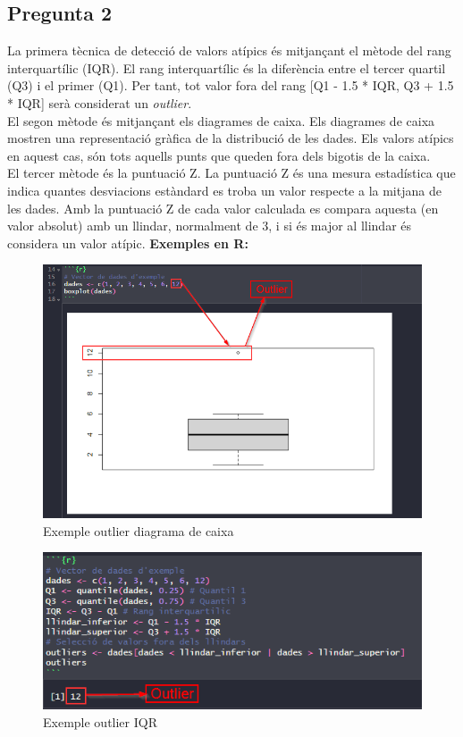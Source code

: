 \documentclass[a4paper,12pt]{report}
\begin{document}
\subsection*{Pregunta 2}
La primera tècnica de detecció de valors atípics és mitjançant el mètode del rang interquartílic (IQR). El rang interquartílic és la diferència entre el tercer quartil (Q3) i el primer (Q1). Per tant, tot valor fora del rang [Q1 - 1.5 * IQR, Q3 + 1.5 * IQR] serà considerat un \textit{outlier}.\\
El segon mètode és mitjançant els diagrames de caixa. Els diagrames de caixa mostren una representació gràfica de la distribució de les dades. Els valors atípics en aquest cas, són tots aquells punts que queden fora dels bigotis de la caixa.\\
El tercer mètode és la puntuació Z. La puntuació Z és una mesura estadística que indica quantes desviacions estàndard es troba un valor respecte a la mitjana de les dades. Amb la puntuació Z de cada valor calculada es compara aquesta (en valor absolut) amb un llindar, normalment de 3, i si és major al llindar és considera un valor atípic.
\newpage
\textbf{Exemples en R:}\\
\begin{figure}[h]
    \centering
    \includegraphics[scale=0.8]{images/boxplot.png}
    \caption{Exemple outlier diagrama de caixa}
    \label{fig:boxplot}
\end{figure}
\begin{figure}[h]
    \centering
    \includegraphics[scale=1]{images/iqr.png}
    \caption{Exemple outlier IQR}
    \label{fig:iqr}
\end{figure}
\end{document}

